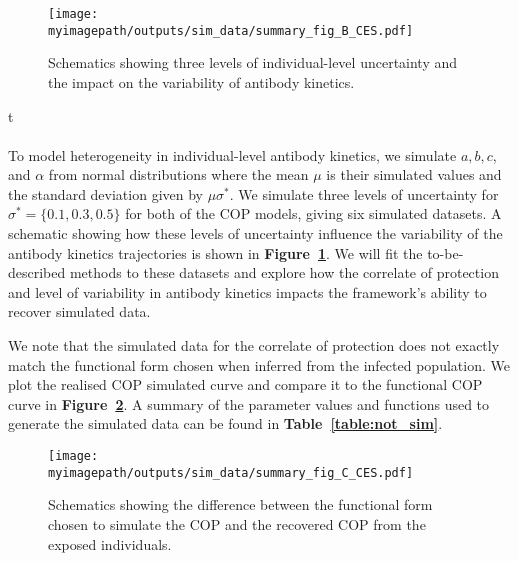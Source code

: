 \begin{figure}[h]
    \centering
    \texttt{[image: \\myimagepath/outputs/sim\_data/summary\_fig\_B\_CES.pdf]}     \caption{Schematics showing three levels of individual-level uncertainty and the impact on the variability of antibody kinetics.}
    \label{fig:sim_B}
\end{figure}

t
\paragraph{}To model heterogeneity in individual-level antibody kinetics, we simulate $a, b, c$, and $\alpha$ from normal distributions where the mean $\mu$ is their simulated values and the standard deviation given by $\mu\sigma^*$. We simulate three levels of uncertainty for $\sigma^* = \{0.1, 0.3, 0.5\}$ for both of the COP models, giving six simulated datasets. A schematic showing how these levels of uncertainty influence the variability of the antibody kinetics trajectories is shown in \textbf{Figure~\ref{fig:sim_B}}. We will fit the to-be-described methods to these datasets and explore how the correlate of protection and level of variability in antibody kinetics impacts the framework's ability to recover simulated data. 

We note that the simulated data for the correlate of protection does not exactly match the functional form chosen when inferred from the infected population. We plot the realised COP simulated curve and compare it to the functional COP curve in \textbf{Figure~\ref{fig:sim_C}}. A summary of the parameter values and functions used to generate the simulated data can be found in \textbf{Table~\ref{table:not_sim}}.

\begin{figure}[h]
    \centering
    \texttt{[image: \\myimagepath/outputs/sim\_data/summary\_fig\_C\_CES.pdf]}     \caption{Schematics showing the difference between the functional form chosen to simulate the COP and the recovered COP from the exposed individuals.   }
    \label{fig:sim_C}
\end{figure}

